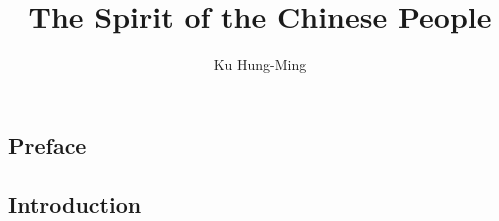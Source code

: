 \documentclass{PT3}
\newcommand{\doctitle}{The Spirit of the Chinese People}
\newcommand{\docauthor}{Ku Hung-Ming} %
\newcommand{\docsubject}{}
\newcommand{\doctitle}{春秋大義}
\newcommand{\docauthor}{辜鴻銘}
\newcommand{\docsubject}{中國人的精神}
\theoremstyle{plain}%
\theoremstyle{definition}
\theoremstyle{remark}
\begin{document}
  \title[\docsubject]{\doctitle}
  \author{\docauthor}


  \frontmatter
  \maketitle
  \tableofcontents


  \begin{preface}
    \chapter*{Preface}
    
  \end{preface}

  \mainmatter

  \begin{introduction}
    \chapter*{Introduction}
    
  \end{introduction}
    
    
    
    
    
    
    

  \backmatter

  \appendix
    
    
  \endappendix

  \theendnotes

  \label{refs}
  

  \cleardoublepage




\end{document}
